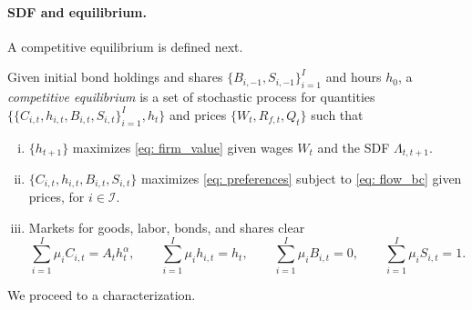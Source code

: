 \paragraph{SDF and equilibrium.}

A competitive equilibrium is defined next.


\begin{definition}
Given initial bond holdings and shares  $\{B_{i,-1}, S_{i,-1}\}_{i=1}^I$ and hours $h_0$, a \textit{competitive equilibrium} is a set of stochastic process for quantities $\{\{C_{i,t}, h_{i,t}, B_{i,t}, S_{i,t}\}_{i=1}^I, h_t\}$ and prices $\{W_t, R_{f,t}, Q_t\}$ such that 
\begin{enumerate}[(i)]
    \item $\{h_{t+1}\}$ maximizes \eqref{eq: firm_value} given wages $W_t$ and the SDF $\Lambda_{t,t+1}$.
    \item $\{C_{i,t}, h_{i,t}, B_{i,t}, S_{i,t}\}$ maximizes \eqref{eq: preferences} subject to \eqref{eq: flow_bc}  given prices, for $i \in \mathcal{I}$. 
    \item Markets for goods, labor, bonds, and shares clear
    \begin{equation*}
        \sum_{i=1}^I \mu_i C_{i,t} = A_t h_t^\alpha, \qquad 
        \sum_{i=1}^I \mu_i h_{i,t} = h_t, \qquad 
        \sum_{i=1}^I \mu_i B_{i,t} = 0, \qquad 
        \sum_{i=1}^I \mu_i S_{i,t} = 1.
    \end{equation*}
\end{enumerate}
\end{definition}
We proceed to a characterization.

